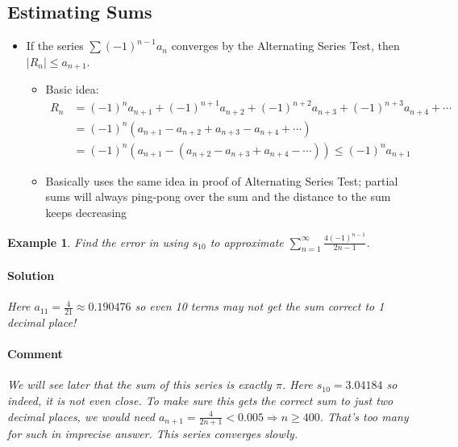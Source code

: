\documentclass[letterpaper, 11pt, openany]{book}
\theoremstyle{mytheoremstyle}
\theoremstyle{myexamplestyle}
\newtheorem{example}{Example}[section]
\newenvironment{solution}{\paragraph{\sffamily \smaller \fontseries{b}\selectfont Solution}}{\hfill\faSquare}
\newenvironment{commentary}{\paragraph{\sffamily \smaller \fontseries{b}\selectfont Comment}}{}
\begin{document}
\subsection{Estimating Sums}

\begin{itemize}
    \item If the series $\sum (-1)^{n-1}a_{n}$ converges by the Alternating Series Test, then $|R_{n}| \leq a_{n+1}$.
    \begin{itemize}
        \item Basic idea:
        \begin{align*}
            R_{n}   &= (-1)^{n}a_{n+1} + (-1)^{n+1}a_{n+2} + (-1)^{n+2}a_{n+3} + (-1)^{n+3}a_{n+4} + \cdots \\
                    &= (-1)^{n}\left( a_{n+1} - a_{n+2} + a_{n+3} - a_{n+4} + \cdots \right)\\
                    &= (-1)^{n}\left( a_{n+1} - \left( a_{n+2} - a_{n+3} + a_{n+4} - \cdots \right) \right) \leq (-1)^{n} a_{n+1}
        \end{align*}
        \item Basically uses the same idea in proof of Alternating Series Test; partial sums will always ping-pong over the sum and the distance to the sum keeps decreasing
    \end{itemize}
\end{itemize}

\begin{example}\label{e:altseriesestsum}
    Find the error in using $s_{10}$ to approximate $\displaystyle \sum_{n=1}^{\infty} \frac{4(-1)^{n-1}}{2n -1}$.
    \begin{solution}
        Here $a_{11} = \frac{4}{21} \approx 0.190476$ so even 10 terms may not get the sum correct to 1 decimal place! 
    \end{solution}

    \begin{commentary}
        We will see later that the sum of this series is exactly $\pi$. Here $s_{10} = 3.04184$ so indeed, it is not even close. To make sure this gets the correct sum to just two decimal places, we would need $\displaystyle a_{n+1} = \frac{4}{2n+1} < 0.005 \Rightarrow n \geq 400$. That's too many for such in imprecise answer. This series converges slowly.
    \end{commentary}    
\end{example}
\end{document}
